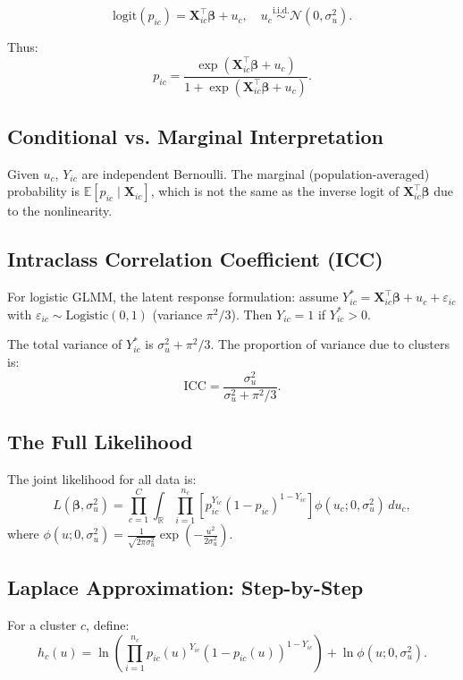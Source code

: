 \documentclass[12pt]{article}
\numberwithin{equation}{section}
\begin{document}
	\[
	\text{logit}(p_{ic}) = \mathbf{X}_{ic}^\top \boldsymbol{\beta} + u_c, \quad u_c \overset{\text{i.i.d.}}{\sim} \mathcal{N}(0, \sigma_u^2).
	\]
	
	Thus:
	\[
	p_{ic} = \frac{\exp(\mathbf{X}_{ic}^\top \boldsymbol{\beta} + u_c)}{1 + \exp(\mathbf{X}_{ic}^\top \boldsymbol{\beta} + u_c)}.
	\]
	
	\subsection{Conditional vs. Marginal Interpretation}
	
	Given $u_c$, $Y_{ic}$ are independent Bernoulli. The marginal (population-averaged) probability is $\mathbb{E}[p_{ic} \mid \mathbf{X}_{ic}]$, which is not the same as the inverse logit of $\mathbf{X}_{ic}^\top \boldsymbol{\beta}$ due to the nonlinearity.
	
	\subsection{Intraclass Correlation Coefficient (ICC)}
	
	For logistic GLMM, the latent response formulation: assume $Y_{ic}^* = \mathbf{X}_{ic}^\top \boldsymbol{\beta} + u_c + \varepsilon_{ic}$ with $\varepsilon_{ic} \sim \text{Logistic}(0,1)$ (variance $\pi^2/3$). Then $Y_{ic} = 1$ if $Y_{ic}^* > 0$.
	
	The total variance of $Y_{ic}^*$ is $\sigma_u^2 + \pi^2/3$. The proportion of variance due to clusters is:
	\[
	\text{ICC} = \frac{\sigma_u^2}{\sigma_u^2 + \pi^2/3}.
	\]
	
	\subsection{The Full Likelihood}
	
	The joint likelihood for all data is:
	\[
	L(\boldsymbol{\beta}, \sigma_u^2) = \prod_{c=1}^C \int_{\mathbb{R}} \prod_{i=1}^{n_c} \left[ p_{ic}^{Y_{ic}} (1-p_{ic})^{1-Y_{ic}} \right] \phi(u_c; 0, \sigma_u^2) \, du_c,
	\]
	where $\phi(u; 0, \sigma_u^2) = \frac{1}{\sqrt{2\pi\sigma_u^2}} \exp\left(-\frac{u^2}{2\sigma_u^2}\right)$.
	
	\subsection{Laplace Approximation: Step-by-Step}
	
	For a cluster $c$, define:
	\[
	h_c(u) = \ln\left( \prod_{i=1}^{n_c} p_{ic}(u)^{Y_{ic}} (1-p_{ic}(u))^{1-Y_{ic}} \right) + \ln \phi(u; 0, \sigma_u^2).
	\]
	
\end{document}
